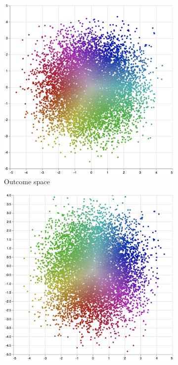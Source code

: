 \begin{subappendices}
\begin{figure}[h]
\centering
\begin{subfigure}[t]{0.3\textwidth}
    \includegraphics[width=\textwidth]{figures/dyne/state_space_rainbow.png}
    \caption{Outcome space}
\end{subfigure}
\begin{subfigure}[t]{0.3\textwidth}
    \includegraphics[width=\textwidth]{figures/dyne/latent_space_rainbow.png}

\end{subfigure}
\end{figure}
\end{subappendices}
